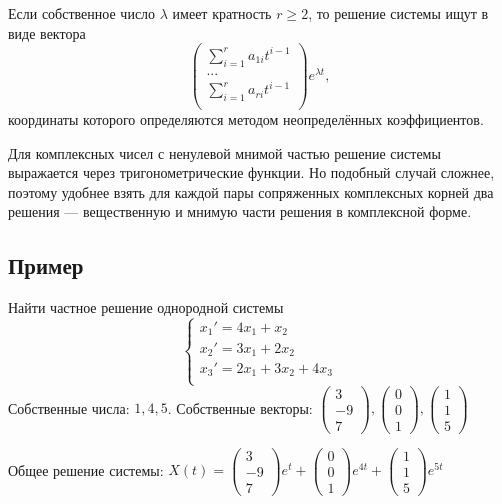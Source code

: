 \documentclass[12pt]{article}
\begin{document}
    Если собственное число $\lambda$ имеет кратность $r \geq 2$, то решение системы ищут в виде вектора
    \[
        \begin{pmatrix}
            \sum_{i = 1}^r a_{1i}t^{i - 1} \\
            ...                            \\
            \sum_{i = 1}^r a_{ri}t^{i - 1} \\
        \end{pmatrix} e^{\lambda t},
    \]
    координаты которого определяются методом неопределённых коэффициентов.

    Для комплексных чисел с ненулевой мнимой частью решение системы выражается через тригонометрические функции. Но подобный случай сложнее, поэтому удобнее взять для каждой пары сопряженных комплексных корней два решения --- вещественную и мнимую части решения в комплексной форме.

    \subsection{Пример}
    Найти частное решение однородной системы
    \[\begin{cases}
            x_1' = 4x_1 + x_2         \\
            x_2' = 3x_1 + 2x_2        \\
            x_3' = 2x_1 + 3x_2 + 4x_3 \\
        \end{cases}\]
    Собственные числа: $1, 4, 5$. Собственные векторы: $
\begin{pmatrix}3 \\ -9 \\ 7\end{pmatrix},
\begin{pmatrix}0 \\ 0 \\ 1\end{pmatrix},
\begin{pmatrix}1\\ 1 \\ 5\end{pmatrix}$

    Общее решение системы: $X(t) =
\begin{pmatrix}3 \\ -9 \\ 7\end{pmatrix}e^t +
\begin{pmatrix}0 \\ 0 \\ 1\end{pmatrix}e^{4t} +
\begin{pmatrix}1\\ 1 \\ 5\end{pmatrix}e^{5t}$
\end{document}
